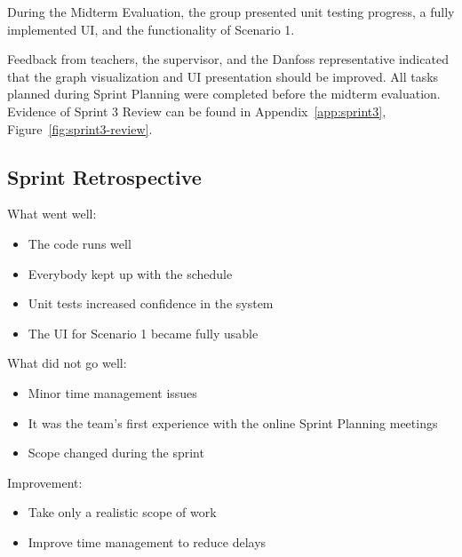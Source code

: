 During the Midterm Evaluation, the group presented unit testing progress, a fully implemented UI, and the functionality of Scenario 1.

Feedback from teachers, the supervisor, and the Danfoss representative indicated that the graph visualization and UI presentation should be improved. All tasks planned during Sprint Planning were completed before the midterm evaluation. Evidence of Sprint 3 Review can be found in Appendix~\ref{app:sprint3}, Figure~\ref{fig:sprint3-review}.

 

\subsection*{Sprint Retrospective}

What went well:

\begin{itemize}

    \item The code runs well

    \item Everybody kept up with the schedule 

    \item Unit tests increased confidence in the system

    \item The UI for Scenario 1 became fully usable

\end{itemize}



What did not go well:

\begin{itemize}

    \item  Minor time management issues
    
    \item  It was the team's first experience with the online Sprint Planning meetings
    
    \item  Scope changed during the sprint

\end{itemize}



Improvement:

\begin{itemize}

 \item Take only a realistic scope of work

 \item Improve time management to reduce delays

\end{itemize}

